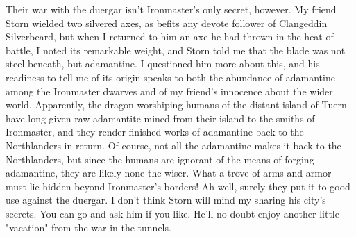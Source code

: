 \documentclass[10pt,a4paper,twoside,twocolumn,openany,bg=print,nodeprecatedcode]{dndbook}
\begin{document}
Their war with the duergar isn't Ironmaster's only secret, however. My friend Storn wielded two silvered axes, as befits any devote follower of Clangeddin Silverbeard, but when I returned to him an axe he had thrown in the heat of battle, I noted its remarkable weight, and Storn told me that the blade was not steel beneath, but adamantine. I questioned him more about this, and his readiness to tell me of its origin speaks to both the abundance of adamantine among the Ironmaster dwarves and of my friend's innocence about the wider world. Apparently, the dragon-worshiping humans of the distant island of Tuern have long given raw adamantite mined from their island to the smiths of Ironmaster, and they render finished works of adamantine back to the Northlanders in return. Of course, not all the adamantine makes it back to the Northlanders, but since the humans are ignorant of the means of forging adamantine, they are likely none the wiser. What a trove of arms and armor must lie hidden beyond Ironmaster's borders! Ah well, surely they put it to good use against the duergar.
I don't think Storn will mind my sharing his city's secrets. You can go and ask him if you like. He'll no doubt enjoy another little "vacation" from the war in the tunnels.
\end{document}
